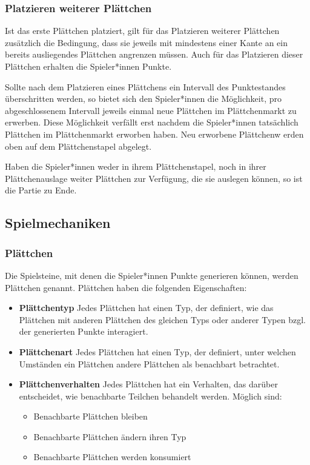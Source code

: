 \documentclass[../main.tex]{subfiles}
\begin{document}
	\subsubsection{Platzieren weiterer Plättchen}
	\par Ist das erste Plättchen platziert, gilt für das Platzieren weiterer Plättchen zusätzlich die Bedingung, dass sie jeweils mit mindestens einer Kante an ein bereits ausliegendes Plättchen angrenzen müssen. Auch für das Platzieren dieser Plättchen erhalten die Spieler*innen Punkte.
	\par Sollte nach dem Platzieren eines Plättchens ein Intervall des Punktestandes überschritten werden, so bietet sich den Spieler*innen die Möglichkeit, pro abgeschlossenem Intervall jeweils einmal neue Plättchen im Plättchenmarkt zu erwerben. Diese Möglichkeit verfällt erst nachdem die Spieler*innen tatsächlich Plättchen im Plättchenmarkt erworben haben. Neu erworbene Plättchenw erden oben auf dem Plättchenstapel abgelegt.
	\par Haben die Spieler*innen weder in ihrem Plättchenstapel, noch in ihrer Plättchenauslage weiter Plättchen zur Verfügung, die sie auslegen können, so ist die Partie zu Ende.

	\subsection{Spielmechaniken}
	\label{section:Spielmechaniken}
	\subsubsection{Plättchen}
	\par Die Spielsteine, mit denen die Spieler*innen Punkte generieren können, werden Plättchen genannt. Plättchen haben die folgenden Eigenschaften:
	\begin{itemize}
		\item \textbf{Plättchentyp} Jedes Plättchen hat einen Typ, der definiert, wie das Plättchen mit anderen Plättchen des gleichen Typs oder anderer Typen bzgl. der generierten Punkte interagiert.
		\item \textbf{Plättchenart} Jedes Plättchen hat einen Typ, der definiert, unter welchen Umständen ein Plättchen andere Plättchen als benachbart betrachtet.
		\item \textbf{Plättchenverhalten} Jedes Plättchen hat ein Verhalten, das darüber entscheidet, wie benachbarte Teilchen behandelt werden. Möglich sind:
		\begin{itemize}
			\item Benachbarte Plättchen bleiben
			\item Benachbarte Plättchen ändern ihren Typ
			\item Benachbarte Plättchen werden konsumiert 
		\end{itemize}
	\end{itemize}
\end{document}

